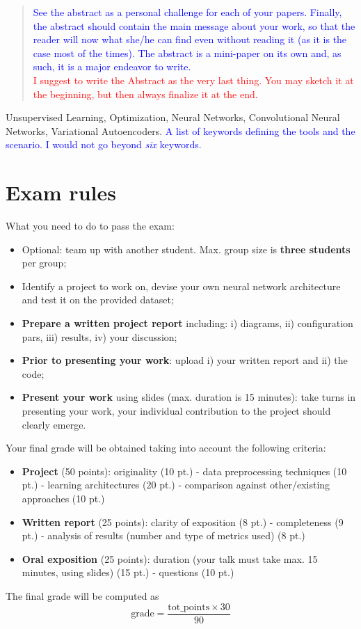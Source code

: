 \documentclass[10pt, conference, letterpaper]{IEEEtran}
\newcommand\MR[1]{\textcolor{blue}{#1}}
\newcommand\red[1]{\textcolor{red}{#1}}
\begin{document}
\begin{abstract}
\MR{See the abstract as a personal challenge for each of your papers. Finally, the abstract should contain the main message about your work, so that the reader will now what she/he can find even without reading it (as it is the case most of the times). The abstract is a mini-paper on its own and, as such, it is a major endeavor to write.}\\ 

\red{I suggest to write the Abstract as the very last thing. You may sketch it at the beginning, but then always finalize it at the end.}
\end{abstract}

\IEEEkeywords
Unsupervised Learning, Optimization, Neural Networks, Convolutional Neural Networks, Variational Autoencoders. \MR{A list of keywords defining the tools and the scenario. I would not go beyond {\it six} keywords.}
\endIEEEkeywords












\section{Exam rules}

What you need to do to pass the exam:
\begin{itemize}
\item Optional: team up with another student. Max. group size is \textbf{three students} per group;
\item Identify a project to work on, devise your own neural network architecture and test it on the provided dataset;
\item \textbf{Prepare a written project report} including: i) diagrams, ii) configuration pars, iii) results, iv) your discussion;
\item \textbf{Prior to presenting your work}: upload i) your written report and ii) the code;
\item \textbf{Present your work} using slides (max. duration is 15 minutes): take turns in presenting your work, your individual contribution to the project should clearly emerge. 
\end{itemize}

Your final grade will be obtained taking into account the following criteria:
\begin{itemize} 
\item \textbf{Project} (50 points): originality (10 pt.) - data preprocessing techniques (10 pt.) - learning architectures (20 pt.) - comparison against other/existing approaches (10 pt.) 
\item \textbf{Written report} (25 points): clarity of exposition (8 pt.) - completeness (9 pt.) - analysis of results (number and type of metrics used) (8 pt.)
\item \textbf{Oral exposition} (25 points): duration (your talk must take max. 15 minutes, using slides) (15 pt.) - questions (10 pt.)
\end{itemize}

The final grade will be computed as
\begin{equation}
\textrm{grade} = \frac{\textrm{tot\_points} \times 30}{90}
\end{equation}



\end{document}
